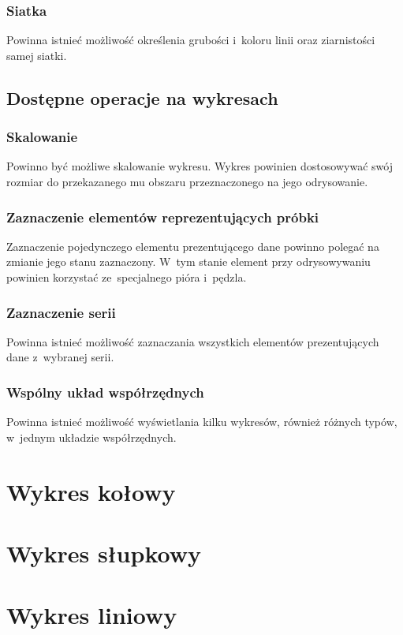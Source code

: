 \documentclass[11pt,twoside,a4paper,final]{article}
\begin{document}
\subsubsection{Siatka}
Powinna istnieć możliwość określenia grubości i~koloru linii oraz ziarnistości samej siatki.

\subsection{Dostępne operacje na wykresach}
\subsubsection{Skalowanie}
Powinno być możliwe skalowanie wykresu. Wykres powinien dostosowywać swój rozmiar do przekazanego mu obszaru przeznaczonego na jego odrysowanie.

\subsubsection{Zaznaczenie elementów reprezentujących próbki}
Zaznaczenie pojedynczego elementu prezentującego dane powinno polegać na zmianie jego stanu zaznaczony. W~tym stanie element przy odrysowywaniu powinien korzystać ze~specjalnego pióra i~pędzla.

\subsubsection{Zaznaczenie serii}
Powinna istnieć możliwość zaznaczania wszystkich elementów prezentujących dane z~wybranej serii.

\subsubsection{Wspólny układ współrzędnych}
Powinna istnieć możliwość wyświetlania kilku wykresów, również różnych typów, w~jednym układzie współrzędnych.

\section{Wykres kołowy}

\section{Wykres słupkowy}

\section{Wykres liniowy}
\end{document}
